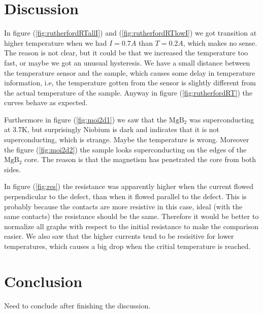 \documentclass{comjnl}
\newcommand*\chem[1]{\ensuremath{\mathrm{#1}}}
\begin{document}
\section{Discussion} \label{Sec:Discussion}
In figure (\ref{fig:rutherfordRTallI}) and (\ref{fig:rutherfordRTlowI}) we got transition at higher temperature when we had $I=0.7A$ than $T=0.2A$, which makes no sense. The reason is not clear, but it could be that we increased the temperature too fast, or maybe we got an unusual hysteresis. We have a small distance between the temperature sensor and the sample, which causes some delay in temperature information, i.e, the temperature gotten from the sensor is slightly different from the actual temperature of the sample. Anyway in figure (\ref{fig:rutherfordRT}) the curves behave as expected. 

Furthermore in figure (\ref{fig:moi2d1}) we saw that the \chem{MgB_2} was superconducting at 3.7K, but surprisingly Niobium is dark and indicates that it is not superconducting, which is strange. Maybe the temperature is wrong. Moreover the figure (\ref{fig:moi2d2}) the sample looks superconducting on the edges of the \chem{MgB_2} core. The reason is that the magnetism has penetrated the core from both sides. 

In figure (\ref{fig:res}) the resistance was apparently higher when the current flowed perpendicular to the defect, than when it flowed parallel to the defect. This is probably because the contacts are more resistive in this case, ideal (with the same contacts) the resistance should be the same. Therefore it would be better to normalize all graphs with respect to the initial resistance to make the comparison easier. We also saw that the higher currents tend to be resisitive for lower temperatures, which causes a big drop when the critial temperature is reached. 

\section{Conclusion} \label{Sec:Conclusion}
Need to conclude after finishing the discussion.

\end{document}
